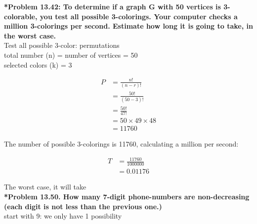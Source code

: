 \documentclass{article}
\begin{document}
    \noindent \textbf{*Problem 13.42: To determine if a graph G with 50 vertices is 3-colorable, you test all possible 3-colorings. Your computer checks a million 3-colorings per second. Estimate how long it is going to take, in the worst case.}
    \\ Test all possible 3-color: permutations
    \\ total number (n) = number of vertices = 50
    \\ selected colors (k) = 3

    \begin{align*}
        P &= \frac{n!}{(n-r)!}\\
        &= \frac{50!}{(50-3)!}\\
        &= \frac{50!}{47!}\\
        &= 50 \times 49 \times 48\\
        &= 11760
    \end{align*}

    The number of possible 3-colorings is 11760, calculating a million per second:

    \begin{align*}
        T &= \frac{11760}{1000000}\\
        &= 0.01176
    \end{align*}

    The worst case, it will take 
    \\[0.25in]
    \noindent \textbf{*Problem 13.50. How many 7-digit phone-numbers are non-decreasing (each digit is not less than the previous one.)}
    \\ start with 9: we only have 1 possibility
\end{document}
